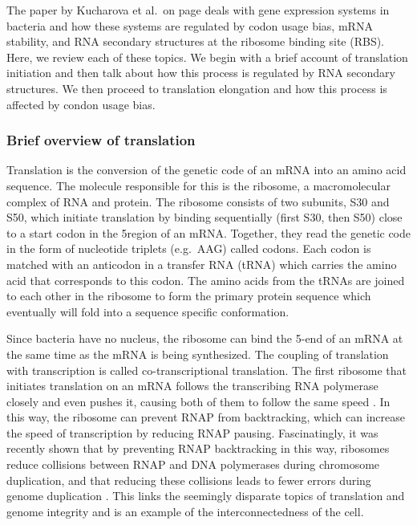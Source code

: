 %
The paper by Kucharova et al.\ on page \pageref{vero_paper} deals with gene
expression systems in bacteria and how these systems are regulated by codon
usage bias, mRNA stability, and RNA secondary structures at the ribosome
binding site (RBS). Here, we review each of these topics. We begin with a brief
account of translation initiation and then talk about how this process is
regulated by RNA secondary structures. We then proceed to translation
elongation and how this process is affected by condon usage bias.

\subsubsection{Brief overview of translation}
Translation is the conversion of the genetic code of an mRNA into an amino acid
sequence. The molecule responsible for this is the ribosome, a macromolecular
complex of RNA and protein. The ribosome consists of two subunits, S30 and S50,
which initiate translation by binding sequentially (first S30, then S50) close
to a start codon in the 5\ppp region of an mRNA.  Together, they read the
genetic code in the form of nucleotide triplets (e.g.\ AAG) called codons. Each
codon is matched with an anticodon in a transfer RNA (tRNA) which carries the
amino acid that corresponds to this codon. The amino acids from the tRNAs are
joined to each other in the ribosome to form the primary protein sequence which
eventually will fold into a sequence specific conformation.

Since bacteria have no nucleus, the ribosome can bind the 5\ppp-end of an mRNA
at the same time as the mRNA is being synthesized. The coupling of translation
with transcription is called co-transcriptional translation. The first ribosome
that initiates translation on an mRNA follows the transcribing RNA polymerase
closely and even pushes it, causing both of them to follow the same speed
\cite{proshkin_cooperation_2010}. In this way, the ribosome can prevent RNAP
from backtracking, which can increase the speed of transcription by reducing
RNAP pausing. Fascinatingly, it was recently shown that by preventing RNAP
backtracking in this way, ribosomes reduce collisions between RNAP and DNA
polymerases during chromosome duplication, and that reducing these collisions
leads to fewer errors during genome duplication \cite{dutta_linking_2011}. This
links the seemingly disparate topics of translation and genome integrity and is
an example of the interconnectedness of the cell.

